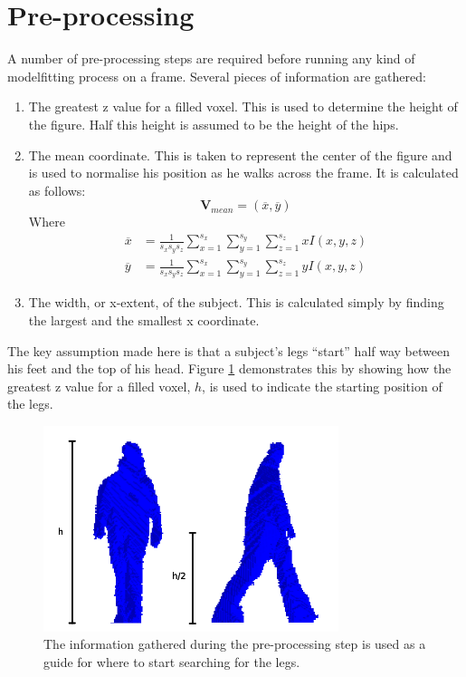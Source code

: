 \section{Pre-processing}\label{LocatingCenter}

A number of pre-processing steps are required before running any kind of modelfitting process on a frame.
Several pieces of information are gathered:

\begin{enumerate}
	\item The greatest z value for a filled voxel.
		This is used to determine the height of the figure.
		Half this height is assumed to be the height of the hips.
	\item The mean coordinate.
		This is taken to represent the center of the figure and is used to normalise his position as he walks across the frame.
		It is calculated as follows:
		\begin{equation}
			\mathbf{V}_{mean} = (\overline{x}, \overline{y})
		\end{equation}
		Where
		\begin{align}
			\overline{x} &= \frac{1}{s_x s_y s_z} \sum_{x=1}^{s_x} \sum_{y=1}^{s_y} \sum_{z=1}^{s_z} x I(x,y,z) \\
			\overline{y} &= \frac{1}{s_x s_y s_z} \sum_{x=1}^{s_x} \sum_{y=1}^{s_y} \sum_{z=1}^{s_z} y I(x,y,z)
		\end{align}
	\item The width, or x-extent, of the subject.
		This is calculated simply by finding the largest and the smallest x coordinate.
\end{enumerate}

The key assumption made here is that a subject's legs ``start'' half way between his feet and the top of his head.
Figure \ref{Preprocessing} demonstrates this by showing how the greatest z value for a filled voxel, $h$, is used to
indicate the starting position of the legs.

\begin{figure}[b]
	\centering
	\includegraphics[height=6cm]{preprocessing.png}
	\caption{The information gathered during the pre-processing step is used as a guide for where to start searching for the legs.}
	\label{Preprocessing}
\end{figure}
